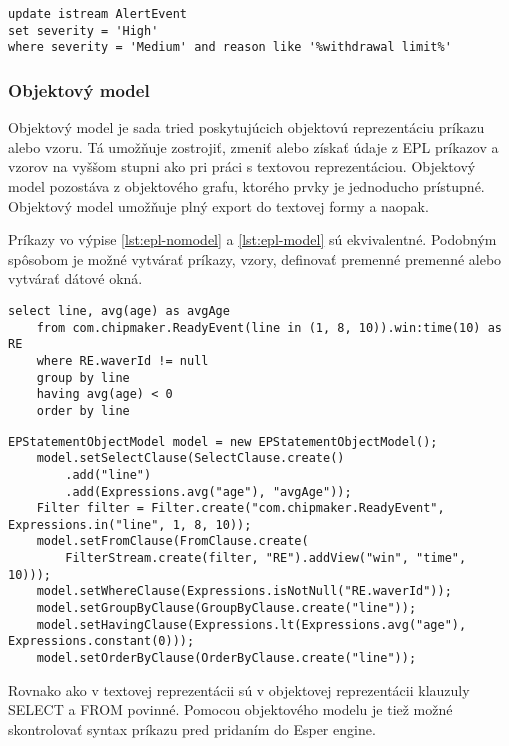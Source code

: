 		\begin{lstlisting}[label=lst:update,caption=Príklady úpravy udalosti pred spracovaním]
update istream AlertEvent 
set severity = 'High'
where severity = 'Medium' and reason like '%withdrawal limit%'		
		\end{lstlisting}
		
		\subsubsection{Objektový model}	
		Objektový model je sada tried poskytujúcich objektovú reprezentáciu príkazu alebo vzoru. Tá umožňuje zostrojiť, zmeniť alebo získať údaje z EPL príkazov a vzorov na vyššom stupni ako pri práci s textovou reprezentáciou. Objektový model pozostáva z objektového grafu, ktorého prvky je jednoducho prístupné. Objektový model umožňuje plný export do textovej formy a naopak.
		
		Príkazy vo výpise \ref{lst:epl-nomodel} a \ref{lst:epl-model} sú ekvivalentné. Podobným spôsobom je možné vytvárať príkazy, vzory, definovať premenné premenné alebo vytvárať dátové okná.
		
		\begin{lstlisting}[label=lst:epl-nomodel,caption=EPL príkaz bez použitia objektového modelu]
	select line, avg(age) as avgAge 
	from com.chipmaker.ReadyEvent(line in (1, 8, 10)).win:time(10) as RE
	where RE.waverId != null
	group by line 
	having avg(age) < 0
	order by line
		\end{lstlisting}
		
		\begin{lstlisting}[label=lst:epl-model,caption=EPL príkaz s použitím objektového modelu]
	EPStatementObjectModel model = new EPStatementObjectModel();
	model.setSelectClause(SelectClause.create()
		.add("line")
		.add(Expressions.avg("age"), "avgAge"));
	Filter filter = Filter.create("com.chipmaker.ReadyEvent", Expressions.in("line", 1, 8, 10));
	model.setFromClause(FromClause.create(
		FilterStream.create(filter, "RE").addView("win", "time", 10)));
	model.setWhereClause(Expressions.isNotNull("RE.waverId"));
	model.setGroupByClause(GroupByClause.create("line"));
	model.setHavingClause(Expressions.lt(Expressions.avg("age"), Expressions.constant(0)));
	model.setOrderByClause(OrderByClause.create("line"));
		\end{lstlisting}
	
		Rovnako ako v textovej reprezentácii sú v objektovej reprezentácii klauzuly SELECT a FROM povinné. Pomocou objektového modelu je tiež možné skontrolovať syntax príkazu pred pridaním do Esper engine.

